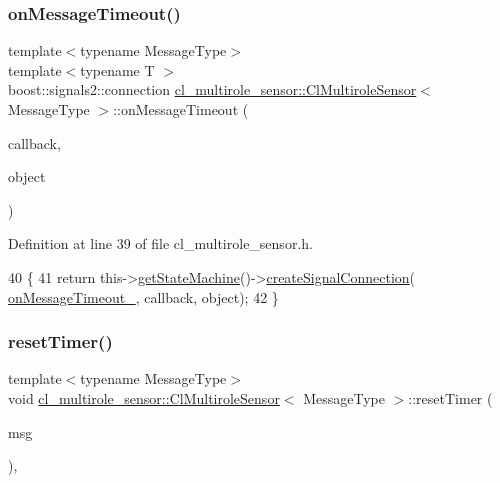 \subsubsection{\texorpdfstring{on\+Message\+Timeout()}{onMessageTimeout()}}
{\footnotesize\ttfamily template$<$typename Message\+Type$>$ \\
template$<$typename T $>$ \\
boost\+::signals2\+::connection \hyperlink{classcl__multirole__sensor_1_1ClMultiroleSensor}{cl\+\_\+multirole\+\_\+sensor\+::\+Cl\+Multirole\+Sensor}$<$ Message\+Type $>$\+::on\+Message\+Timeout (\begin{DoxyParamCaption}\item[{void(T\+::$\ast$)(const ros\+::\+Timer\+Event \&)}]{callback,  }\item[{T $\ast$}]{object }\end{DoxyParamCaption})\hspace{0.3cm}{\ttfamily [inline]}}



Definition at line 39 of file cl\+\_\+multirole\+\_\+sensor.\+h.


\begin{DoxyCode}
40   \{
41     \textcolor{keywordflow}{return} this->\hyperlink{classsmacc_1_1ISmaccClient_aec51d4712404cb9882b86e4c854bb93a}{getStateMachine}()->\hyperlink{classsmacc_1_1ISmaccStateMachine_adf0f42ade0c65cc471960fe2a7c42da2}{createSignalConnection}(
      \hyperlink{classcl__multirole__sensor_1_1ClMultiroleSensor_afd37257b949c421d4f579b47352be95f}{onMessageTimeout\_}, callback, \textcolor{keywordtype}{object});
42   \}
\end{DoxyCode}
\mbox{\label{classcl__multirole__sensor_1_1ClMultiroleSensor_afa5b63048466234906971db69677b3f0}} 
\subsubsection{\texorpdfstring{reset\+Timer()}{resetTimer()}}
{\footnotesize\ttfamily template$<$typename Message\+Type$>$ \\
void \hyperlink{classcl__multirole__sensor_1_1ClMultiroleSensor}{cl\+\_\+multirole\+\_\+sensor\+::\+Cl\+Multirole\+Sensor}$<$ Message\+Type $>$\+::reset\+Timer (\begin{DoxyParamCaption}\item[{const Message\+Type \&}]{msg }\end{DoxyParamCaption})\hspace{0.3cm}{\ttfamily [inline]}, {\ttfamily [protected]}}



